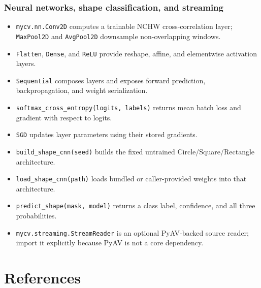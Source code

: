 \documentclass[11pt,a4paper]{article}
\newcommand{\1}{\mathbf{1}}
\begin{document}
\subsubsection{Neural networks, shape classification, and streaming}
\begin{itemize}
 \item \texttt{mycv.nn.Conv2D} computes a trainable NCHW cross-correlation layer; \texttt{MaxPool2D} and \texttt{AvgPool2D} downsample non-overlapping windows.
 \item \texttt{Flatten}, \texttt{Dense}, and \texttt{ReLU} provide reshape, affine, and elementwise activation layers.
 \item \texttt{Sequential} composes layers and exposes forward prediction, backpropagation, and weight serialization.
 \item \texttt{softmax\_cross\_entropy(logits, labels)} returns mean batch loss and gradient with respect to logits.
 \item \texttt{SGD} updates layer parameters using their stored gradients.
 \item \texttt{build\_shape\_cnn(seed)} builds the fixed untrained Circle/Square/Rectangle architecture.
 \item \texttt{load\_shape\_cnn(path)} loads bundled or caller-provided weights into that architecture.
 \item \texttt{predict\_shape(mask, model)} returns a class label, confidence, and all three probabilities.
 \item \texttt{mycv.streaming.StreamReader} is an optional PyAV-backed source reader; import it explicitly because PyAV is not a core dependency.
\end{itemize}

\section{References}
\end{document}

